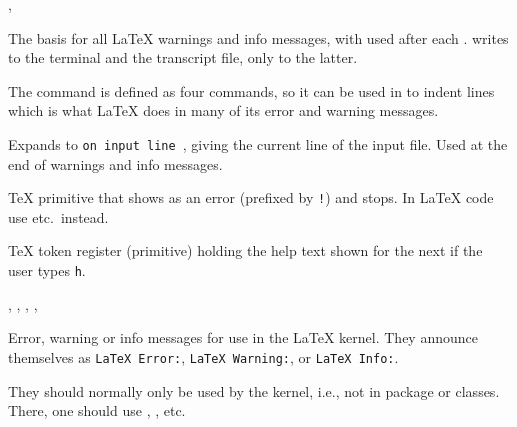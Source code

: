 \documentclass{l3in2edoc}
\begin{document}
\begin{function}[]
  {
    \GenericInfo,
    \GenericWarning
  }
  \begin{syntax}
  \end{syntax}
  The basis for all \LaTeX{} warnings and info messages, with
   used after each .
   writes to the terminal and the transcript file,
   only to the latter.
\end{function}






\begin{function}[EXP]
  {
    \@spaces
  }
  The command  is defined as four  commands,
  so it can be used in  to indent lines which is what
  \LaTeX{} does in many of its error and warning messages.

\end{function}




\begin{function}[EXP]
  {
    \on@line
  }
  Expands to \texttt{\textvisiblespace on input line }, giving the
  current line of the input file. Used at the end of warnings and
  info messages.
\end{function}






\begin{function}[]
  {
    \errmessage
  }
  \begin{syntax}
     
  \end{syntax}
  \TeX{} primitive that shows  as an error (prefixed
  by \texttt{!}) and stops. In \LaTeX{} code use
   etc.\ instead.
\end{function}

\begin{function}[]
  {
    \errhelp
  }
  \begin{syntax}
     
  \end{syntax}
  \TeX{} token register (primitive) holding the help text shown for the
  next  if the user types \texttt{h}.
\end{function}


\begin{function}[int]
  {
    \@latex@error,
    \@latex@warning,
    \@latex@warning@no@line,
    \@latex@note,
    \@latex@note@no@line
  }
  \begin{syntax}
      
     
  \end{syntax}
  Error, warning or info messages for use in the \LaTeX{} kernel. They
  announce themselves as \texttt{LaTeX Error:}, \texttt{LaTeX Warning:},
  or \texttt{LaTeX Info:}.

  They should normally only be used by the kernel, i.e., not in
  package or classes. There, one should use ,
  , etc.
\end{function}
\end{document}
